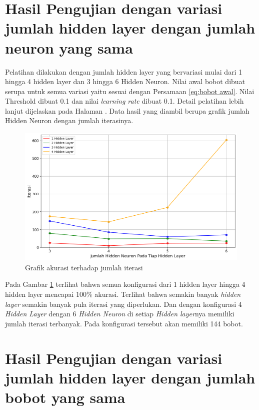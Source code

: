 \section{Hasil Pengujian  dengan variasi jumlah hidden layer dengan jumlah neuron yang
sama}

Pelatihan dilakukan dengan jumlah hidden layer yang bervariasi mulai dari 1 hingga 4 hidden layer dan 3 hingga 6 Hidden Neuron. Nilai awal bobot dibuat serupa untuk semua variasi yaitu sesuai dengan Persamaan \ref{eq:bobot awal}. Nilai Threshold dibuat 0.1 dan nilai \textit{learning rate} dibuat 0.1. Detail pelatihan lebih lanjut dijelaskan pada Halaman \pageref{fig:Flowchart Class}. Data hasil yang diambil berupa grafik jumlah Hidden Neuron dengan jumlah iterasinya.

\begin{figure}[H]
    \centering
    \includegraphics[width=14cm]{contents/chapter-4/5.png}
    \caption{Grafik akurasi terhadap jumlah iterasi}
    \label{fig:Grafik Akurasi}
\end{figure}

Pada Gambar \ref{fig:Grafik Akurasi} terlihat bahwa semua konfigurasi dari 1 hidden layer hingga 4 hidden layer mencapai 100\% akurasi. Terlihat bahwa semakin banyak \textit{hidden layer} semakin banyak pula iterasi yang diperlukan. Dan dengan konfigurasi 4 \textit{Hidden Layer} dengan 6 \textit{Hidden Neuron} di setiap \textit{Hidden layer}nya memiliki jumlah iterasi terbanyak. Pada konfigurasi tersebut akan memiliki 144 bobot. 

\section{Hasil Pengujian dengan variasi jumlah hidden layer dengan jumlah bobot yang
sama}

